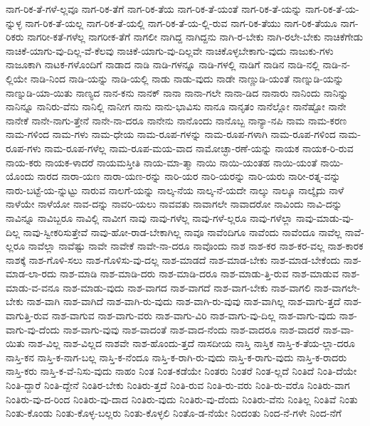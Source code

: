 {ನಾಗ-ರಿಕ-ತೆ-ಗಳೆ-ಲ್ಲವೂ
ನಾಗ-ರಿಕ-ತೆಗೆ
ನಾಗ-ರಿಕ-ತೆಯ
ನಾಗ-ರಿಕ-ತೆ-ಯಂತೆ
ನಾಗ-ರಿಕ-ತೆ-ಯನ್ನು
ನಾಗ-ರಿಕ-ತೆ-ಯ-ನ್ನುಳ್ಳ
ನಾಗ-ರಿಕ-ತೆ-ಯಲ್ಲ
ನಾಗ-ರಿಕ-ತೆ-ಯಲ್ಲಿ
ನಾಗ-ರಿಕ-ತೆ-ಯ-ಲ್ಲಿ-ರುವ
ನಾಗ-ರಿಕ-ತೆಯು
ನಾಗ-ರಿಕ-ತೆಯೂ
ನಾಗ-ರಿಕರು
ನಾಗರೀ-ಕತೆ-ಗಳೆಲ್ಲ
ನಾಗರೀಕ-ತೆಗೆ
ನಾಗಲೀ
ನಾಗಿದ್ದ
ನಾಗಿದ್ದನು
ನಾಗಿ-ರ-ಬೇಕು
ನಾಗಿ-ರಲೇ-ಬೇಕು
ನಾಚಿಕೆಗೇಡು
ನಾಚಿಕೆ-ಯಾಗು-ವು-ದಿಲ್ಲ-ವೆ-ಕೆಲವು
ನಾಚಿಕೆ-ಯಾಗು-ವು-ದಿಲ್ಲವೇ
ನಾಚಿಕೊಳ್ಳಬೇಕಾಗು-ವುದು
ನಾಜುಕು-ಗಳು
ನಾಜೂಕಾಗಿ
ನಾಟಕ-ಗಳೊಂದಿಗೆ
ನಾಡಾದ
ನಾಡಿ
ನಾಡಿ-ಗಳನ್ನೂ
ನಾಡಿ-ಗಳಲ್ಲಿ
ನಾಡಿಗೆ
ನಾಡಿನ
ನಾಡಿ-ನಲ್ಲಿ
ನಾಡಿ-ನ-ಲ್ಲಿಯೇ
ನಾಡಿ-ನಿಂದ
ನಾಡಿ-ಯನ್ನು
ನಾಡಿ-ಯಲ್ಲಿ
ನಾಡು
ನಾಡು-ವುದು
ನಾಡೇ
ನಾಣ್ಣುಡಿ-ಯಂತೆ
ನಾಣ್ನುಡಿ-ಯನ್ನು
ನಾಣ್ನುಡಿ-ಯಾ-ಯಿತು
ನಾಣ್ಯದ
ನಾನ-ಕನು
ನಾನಕ್
ನಾನಾ
ನಾನಾ-ಗಲೇ
ನಾನಾ-ಡಿದ
ನಾನಾರು
ನಾನಿಂದು
ನಾನಿನ್ನು
ನಾನಿನ್ನೂ
ನಾನಿರು-ವೆನು
ನಾನಿಲ್ಲಿ
ನಾನೀಗ
ನಾನು
ನಾನು-ಭಾವಿಸು
ನಾನೂ
ನಾನೃತಂ
ನಾನೆಲ್ಲೋ
ನಾನೆಷ್ಟೋ
ನಾನೇ
ನಾನೇಕೆ
ನಾನೇ-ನಾಗು-ತ್ತೇನೆ
ನಾನೇ-ನಾ-ದರೂ
ನಾನೇನು
ನಾನೊಂದು
ನಾನೊಬ್ಬ
ನಾನ್ಯಾ-ನಪಿ
ನಾಮ
ನಾಮ-ಕರಣ
ನಾಮ-ಗಳಿಂದ
ನಾಮ-ಗಳು
ನಾಮ-ಧೇಯ
ನಾಮ-ರೂಪ-ಗಳನ್ನು
ನಾಮ-ರೂಪ-ಗಳಾಗಿ
ನಾಮ-ರೂಪ-ಗಳಿಂದ
ನಾಮ-ರೂಪ-ಗಳು
ನಾಮ-ರೂಪ-ಗಳೆಲ್ಲ
ನಾಮ-ರೂಪ-ಮಯ-ವಾದ
ನಾಮೋಚ್ಛಾ-ರಣೆ-ಯನ್ನು
ನಾಯಕ
ನಾಯಕ-ರಿ-ರುವ
ನಾಯ-ಕರು
ನಾಯಕ-ಳಾದರೆ
ನಾಯಮಸ್ತೀತಿ
ನಾಯ-ಮಾ-ತ್ಮಾ
ನಾಯಿ
ನಾಯಿ-ಯಂತಹ
ನಾಯಿ-ಯಂತೆ
ನಾಯಿ-ಯೊಂದು
ನಾರದ
ನಾರಾ-ಯಣ
ನಾರಾ-ಯಣ-ರನ್ನು
ನಾರಿ-ಯರ
ನಾರಿ-ಯರನ್ನು
ನಾರಿ-ಯರು
ನಾರೀ-ರತ್ನ-ವನ್ನು
ನಾರು-ಬಟ್ಟೆ-ಯ-ನ್ನುಟ್ಟು
ನಾರುವ
ನಾಲಗೆ-ಯನ್ನು
ನಾಲ್ಕ-ನೆಯ
ನಾಲ್ಕ-ನೆ-ಯದೇ
ನಾಲ್ಕು
ನಾಲ್ಕೂ
ನಾಲ್ಕೈದು
ನಾಳೆ
ನಾಳೆಯೇ
ನಾಳೆಯೋ
ನಾವ-ದನ್ನು
ನಾವರಿ-ಯಲು
ನಾವವತು
ನಾವಾಗಲೇ
ನಾವಾದರೋ
ನಾವಿಂದು
ನಾವಿ-ದನ್ನು
ನಾವಿನ್ನೂ
ನಾವಿಬ್ಬರೂ
ನಾವಿಲ್ಲಿ
ನಾವೀಗ
ನಾವು
ನಾವು-ಗಳೆಲ್ಲ
ನಾವು-ಗಳೆ-ಲ್ಲರೂ
ನಾವು-ಗಳೆಲ್ಲಾ
ನಾವು-ಮಾಡು-ವು-ದಿಲ್ಲ
ನಾವು-ಸ್ವೀಕರಿಸುತ್ತೇವೆ
ನಾವು-ಹೋ-ರಾಡ-ಬೇಕಾಗಿಲ್ಲ
ನಾವೂ
ನಾವೆಂದಿಗೂ
ನಾವೆಂದು
ನಾವೆಂದೂ
ನಾವೆಲ್ಲ
ನಾವೆ-ಲ್ಲರೂ
ನಾವೆಲ್ಲಾ
ನಾವೆಷ್ಟು
ನಾವೇ
ನಾವೇಕೆ
ನಾವೇ-ನಾ-ದರೂ
ನಾವೊಂದು
ನಾಶ
ನಾಶ-ಕರ
ನಾಶ-ಕರ-ವಲ್ಲ
ನಾಶ-ಕಾರಕ
ನಾಶಕ್ಕೆ
ನಾಶ-ಗೊಳಿ-ಸಲು
ನಾಶ-ಗೊಳಿಸು-ವು-ದಲ್ಲ
ನಾಶ-ಮಾಡದೆ
ನಾಶ-ಮಾಡ-ಬೇಕು
ನಾಶ-ಮಾಡ-ಬೇಕೆಂದು
ನಾಶ-ಮಾಡ-ಲಾ-ರದು
ನಾಶ-ಮಾಡಿ
ನಾಶ-ಮಾಡಿ-ದರು
ನಾಶ-ಮಾಡಿ-ದರೂ
ನಾಶ-ಮಾಡು-ತ್ತಿ-ರುವ
ನಾಶ-ಮಾಡುವ
ನಾಶ-ಮಾಡು-ವ-ವನೂ
ನಾಶ-ಮಾಡು-ವುದು
ನಾಶ-ವಾಗದ
ನಾಶ-ವಾಗದೆ
ನಾಶ-ವಾಗ-ಬೇಕು
ನಾಶ-ವಾಗಲಿ
ನಾಶ-ವಾಗಲೇ-ಬೇಕು
ನಾಶ-ವಾಗಿ
ನಾಶ-ವಾಗಿದೆ
ನಾಶ-ವಾಗಿ-ರು-ವುದು
ನಾಶ-ವಾಗಿ-ರು-ವುವು
ನಾಶ-ವಾಗಿಲ್ಲ
ನಾಶ-ವಾಗು-ತ್ತದೆ
ನಾಶ-ವಾಗುತ್ತಿ-ರುವ
ನಾಶ-ವಾಗುವ
ನಾಶ-ವಾಗು-ವರು
ನಾಶ-ವಾಗು-ವಿರಿ
ನಾಶ-ವಾಗು-ವು-ದಿಲ್ಲ
ನಾಶ-ವಾಗು-ವುದು
ನಾಶ-ವಾಗು-ವು-ದೆಂದು
ನಾಶ-ವಾಗು-ವುವು
ನಾಶ-ವಾದಂತೆ
ನಾಶ-ವಾದ-ನೆಂದು
ನಾಶ-ವಾದರೂ
ನಾಶ-ವಾದರೆ
ನಾಶ-ವಾ-ಯಿತು
ನಾಶ-ವಿಲ್ಲ
ನಾಶ-ವಿಲ್ಲದ
ನಾಶವೇ
ನಾಶ-ಹೊಂದು-ತ್ತದೆ
ನಾಸದೀಯ
ನಾಸ್ತಿ
ನಾಸ್ತಿಕ
ನಾಸ್ತಿ-ಕ-ತೆಯ-ಲ್ಲಾ-ದರೂ
ನಾಸ್ತಿ-ಕನ
ನಾಸ್ತಿ-ಕ-ನಾಗ-ಬಲ್ಲ
ನಾಸ್ತಿ-ಕ-ನೆಂದೂ
ನಾಸ್ತಿ-ಕ-ರಾಗಿ-ರು-ವುದು
ನಾಸ್ತಿ-ಕ-ರಾಗು-ವುದು
ನಾಸ್ತಿ-ಕ-ರಾದರು
ನಾಸ್ತಿ-ಕರು
ನಾಸ್ತಿ-ಕ-ವೆ-ನಿಸು-ವುದು
ನಾಹಂ
ನಿಂತ
ನಿಂತ-ಕಡೆಯೇ
ನಿಂತರು
ನಿಂತರೆ
ನಿಂತ-ಲ್ಲದೆ
ನಿಂತಿದೆ
ನಿಂತಿ-ದೆಯೇ
ನಿಂತಿ-ದ್ದಾರೆ
ನಿಂತಿ-ದ್ದೇನೆ
ನಿಂತಿರ-ಬೇಕು
ನಿಂತಿರು-ತ್ತದೆ
ನಿಂತಿ-ರುವ
ನಿಂತಿ-ರು-ವರು
ನಿಂತಿ-ರು-ವರೊ
ನಿಂತಿರು-ವಾಗ
ನಿಂತಿರು-ವು-ದ-ರಿಂದ
ನಿಂತಿರು-ವು-ದಾದ
ನಿಂತಿರು-ವುದು
ನಿಂತಿರು-ವು-ದೆಂದು
ನಿಂತಿರು-ವೆನು
ನಿಂತಿಲ್ಲ
ನಿಂತಿವೆ
ನಿಂತು
ನಿಂತು-ಕೊಂಡು
ನಿಂತು-ಕೊಳ್ಳ-ಬಲ್ಲರು
ನಿಂತು-ಕೊಳ್ಳಲಿ
ನಿಂತೊ-ಡ-ನೆಯೇ
ನಿಂದಂತು
ನಿಂದ-ನೆ-ಗಳೇ
ನಿಂದ-ನೆಗೆ
}
